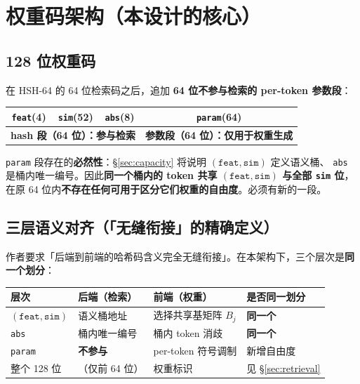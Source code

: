 \documentclass[11pt,a4paper]{ctexart}
\newcommand{\keybox}[1]{%
  \begin{center}\begin{minipage}{0.94\textwidth}%
  \colorbox{graylight}{\begin{minipage}{0.92\textwidth}\vspace{3pt}#1\vspace{3pt}\end{minipage}}%
  \end{minipage}\end{center}}
\newcommand{\warn}[1]{\textcolor{warnred}{\textbf{#1}}}
\newcommand{\ok}[1]{\textcolor{okgreen}{\textbf{#1}}}
\theoremstyle{definition}
\begin{document}
\section{权重码架构（本设计的核心）}\label{sec:arch}

\subsection{128 位权重码}

在 HSH-64 的 64 位检索码之后，追加 \textbf{64 位不参与检索的 per-token 参数段}：

\keybox{%
\begin{center}
\begin{tabular}{@{}cccc@{}}
\toprule
\texttt{feat}(4) & \texttt{sim}(52) & \texttt{abs}(8) & \texttt{param}(64) \\
\midrule
\multicolumn{3}{c}{\textbf{hash 段（64 位）：参与检索}} & \textbf{参数段（64 位）：仅用于权重生成} \\
\bottomrule
\end{tabular}
\end{center}}

\texttt{param} 段存在的\textbf{必然性}：\S\ref{sec:capacity} 将说明 $(\texttt{feat},\texttt{sim})$ 定义语义桶、
\texttt{abs} 是桶内唯一编号。因此\textbf{同一个桶内的 token 共享 $(\texttt{feat},\texttt{sim})$ 与全部 \texttt{sim} 位}，
在原 64 位内\textbf{不存在任何可用于区分它们权重的自由度}。必须有新的一段。

\subsection{三层语义对齐（「无缝衔接」的精确定义）}

作者要求「后端到前端的哈希码含义完全无缝衔接」。在本架构下，三个层次是\textbf{同一个划分}：

\begin{center}
\begin{tabularx}{\textwidth}{@{}lllX@{}}
\toprule
\textbf{层次} & \textbf{后端（检索）} & \textbf{前端（权重）} & \textbf{是否同一划分} \\
\midrule
$(\texttt{feat},\texttt{sim})$ & 语义桶地址 & 选择共享基矩阵 $B_j$ & \ok{同一个} \\
\texttt{abs} & 桶内唯一编号 & 桶内 token 消歧 & \ok{同一个} \\
\texttt{param} & \warn{不参与} & per-token 符号调制 & 新增自由度 \\
整个 128 位 & （仅前 64 位） & 权重标识 & 见 \S\ref{sec:retrieval} \\
\bottomrule
\end{tabularx}
\end{center}
\end{document}
